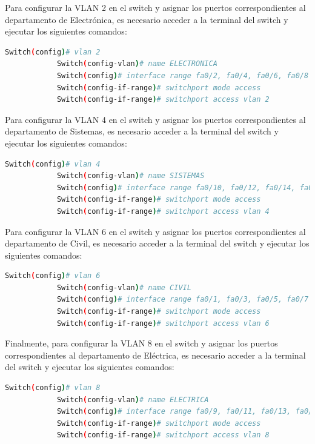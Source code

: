         Para configurar la VLAN 2 en el switch y asignar los puertos correspondientes al departamento de Electrónica, es necesario acceder a la terminal del switch y ejecutar los siguientes comandos:

        \begin{lstlisting}[language=bash, caption={Creación y configuración de la VLAN 2},label={lst:cisco_vlan2}]
            Switch(config)# vlan 2
            Switch(config-vlan)# name ELECTRONICA
            Switch(config)# interface range fa0/2, fa0/4, fa0/6, fa0/8
            Switch(config-if-range)# switchport mode access
            Switch(config-if-range)# switchport access vlan 2
        \end{lstlisting}

        Para configurar la VLAN 4 en el switch y asignar los puertos correspondientes al departamento de Sistemas, es necesario acceder a la terminal del switch y ejecutar los siguientes comandos:

        \begin{lstlisting}[language=bash, caption={Creación y configuración de la VLAN 4},label={lst:cisco_vlan4}]
            Switch(config)# vlan 4
            Switch(config-vlan)# name SISTEMAS
            Switch(config)# interface range fa0/10, fa0/12, fa0/14, fa0/16
            Switch(config-if-range)# switchport mode access
            Switch(config-if-range)# switchport access vlan 4
        \end{lstlisting}

        Para configurar la VLAN 6 en el switch y asignar los puertos correspondientes al departamento de Civil, es necesario acceder a la terminal del switch y ejecutar los siguientes comandos:

        \begin{lstlisting}[language=bash, caption={Creación y configuración de la VLAN 6},label={lst:cisco_vlan6}]
            Switch(config)# vlan 6
            Switch(config-vlan)# name CIVIL
            Switch(config)# interface range fa0/1, fa0/3, fa0/5, fa0/7
            Switch(config-if-range)# switchport mode access
            Switch(config-if-range)# switchport access vlan 6
        \end{lstlisting}

        Finalmente, para configurar la VLAN 8 en el switch y asignar los puertos correspondientes al departamento de Eléctrica, es necesario acceder a la terminal del switch y ejecutar los siguientes comandos:

        \begin{lstlisting}[language=bash, caption={Creación y configuración de la VLAN 8},label={lst:cisco_vlan8}]
            Switch(config)# vlan 8
            Switch(config-vlan)# name ELECTRICA
            Switch(config)# interface range fa0/9, fa0/11, fa0/13, fa0/15
            Switch(config-if-range)# switchport mode access
            Switch(config-if-range)# switchport access vlan 8
        \end{lstlisting}

